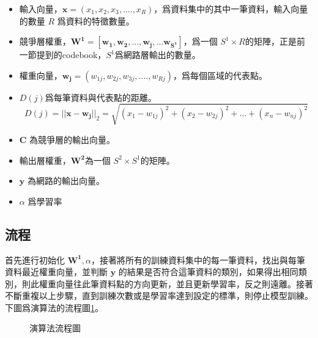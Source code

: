 \begin{itemize}
	\item
	      輸入向量，\(\mathbf{x} = (x_1,x_2,x_3,....,x_R)\)，爲資料集中的其中一筆資料，輸入向量的數量 \(R\) 爲資料的特徵數量。


	\item
		競爭層權重，\(\mathbf{W^1} = [\mathbf{w_1,w_2,...,w_j,...w_{S^1}}]\)，爲一個 \(S^1 \times R \)的矩陣，正是前一節提到的codebook，\(S^1\)爲網路層輸出的數量。
	\item
		權重向量，\(\mathbf{w_{j}} = (w_{1j},w_{2j},w_{3j},....,w_{Rj})\)，爲每個區域的代表點。

	\item
	      \(D(j)\)爲每筆資料與代表點的距離。
	      $$D(j)=||\mathbf{x}-\mathbf{w_j}||_2 = \sqrt{(x_1-w_{1j})^2+(x_2-w_{2j})^2+...+(x_n-w_{nj})^2} $$


	\item
		\(\mathbf{C}\) 為競爭層的輸出向量。

	\item
	      輸出層權重，\(\mathbf{W^2} \)為一個 \(S^2 \times S^1\)的矩陣。

	\item
		\(\mathbf{y}\) 為網路的輸出向量。

	\item
	      \(\alpha\) 爲學習率

\end{itemize}


\subsection{流程}

首先進行初始化 \(\mathbf{W^1},\alpha\)，接著將所有的訓練資料集中的每一筆資料，找出與每筆資料最近權重向量，並判斷 \(\mathbf{y}\) 的結果是否符合這筆資料的類別，如果得出相同類別，則此權重向量往此筆資料點的方向更新，並且更新學習率，反之則遠離。接著不斷重複以上步驟，直到訓練次數或是學習率達到設定的標準，則停止模型訓練。下圖爲演算法的流程圖\ref{fig:AlogrithmWorkflow}。


\usetikzlibrary{positioning, shapes.geometric}



\begin{figure}[H]
	\centering
	
	\caption{演算法流程圖}
	\label{fig:AlogrithmWorkflow}
\end{figure}




